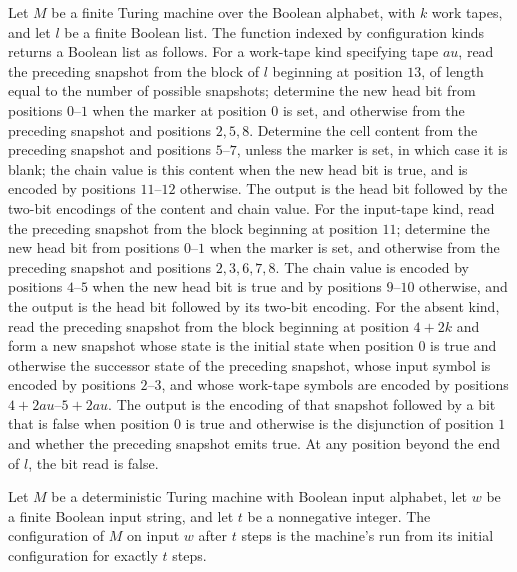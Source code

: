 \begin{definition}
\label{Complexity.cfgF}
\leanok
{}
Let $M$ be a finite Turing machine over the Boolean alphabet, with $k$ work tapes, and
let $l$ be a finite Boolean list. The function indexed by configuration kinds returns a
Boolean list as follows. For a work-tape kind specifying tape $	au$, read the preceding
snapshot from the block of $l$ beginning at position $13$, of length equal to the number
of possible snapshots; determine the new head bit from positions $0$–$1$ when the marker
at position $0$ is set, and otherwise from the preceding snapshot and positions $2,5,8$.
Determine the cell content from the preceding snapshot and positions $5$–$7$, unless the
marker is set, in which case it is blank; the chain value is this content when the new
head bit is true, and is encoded by positions $11$–$12$ otherwise. The output is the
head bit followed by the two-bit encodings of the content and chain value. For the
input-tape kind, read the preceding snapshot from the block beginning at position $11$;
determine the new head bit from positions $0$–$1$ when the marker is set, and otherwise
from the preceding snapshot and positions $2,3,6,7,8$. The chain value is encoded by
positions $4$–$5$ when the new head bit is true and by positions $9$–$10$ otherwise, and
the output is the head bit followed by its two-bit encoding. For the absent kind, read
the preceding snapshot from the block beginning at position $4+2k$ and form a new
snapshot whose state is the initial state when position $0$ is true and otherwise the
successor state of the preceding snapshot, whose input symbol is encoded by positions
$2$–$3$, and whose work-tape symbols are encoded by positions $4+2	au$–$5+2	au$. The
output is the encoding of that snapshot followed by a bit that is false when position
$0$ is true and otherwise is the disjunction of position $1$ and whether the preceding
snapshot emits true. At any position beyond the end of $l$, the bit read is false.
\end{definition}

\begin{definition}
\label{Complexity.CfgTableau.cfgAt}
\leanok
{}
Let $M$ be a deterministic Turing machine with Boolean input alphabet, let $w$ be a
finite Boolean input string, and let $t$ be a nonnegative integer. The configuration of
$M$ on input $w$ after $t$ steps is the machine's run from its initial configuration for
exactly $t$ steps.
\end{definition}

